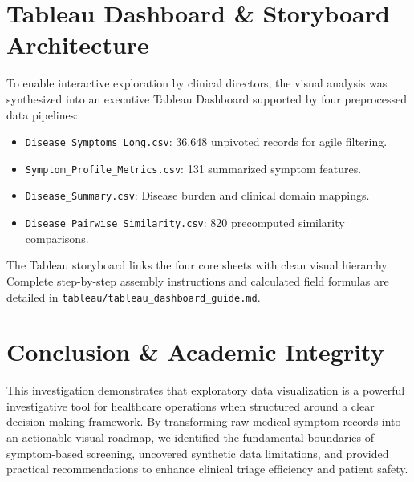 \documentclass[conference]{IEEEtran}
\begin{document}
\section{Tableau Dashboard \& Storyboard Architecture}
To enable interactive exploration by clinical directors, the visual analysis was synthesized into an executive Tableau Dashboard supported by four preprocessed data pipelines:
\begin{itemize}[noitemsep]
    \item \texttt{Disease\_Symptoms\_Long.csv}: 36,648 unpivoted records for agile filtering.
    \item \texttt{Symptom\_Profile\_Metrics.csv}: 131 summarized symptom features.
    \item \texttt{Disease\_Summary.csv}: Disease burden and clinical domain mappings.
    \item \texttt{Disease\_Pairwise\_Similarity.csv}: 820 precomputed similarity comparisons.
\end{itemize}
The Tableau storyboard links the four core sheets with clean visual hierarchy. Complete step-by-step assembly instructions and calculated field formulas are detailed in \texttt{tableau/tableau\_dashboard\_guide.md}.

\section{Conclusion \& Academic Integrity}
This investigation demonstrates that exploratory data visualization is a powerful investigative tool for healthcare operations when structured around a clear decision-making framework. By transforming raw medical symptom records into an actionable visual roadmap, we identified the fundamental boundaries of symptom-based screening, uncovered synthetic data limitations, and provided practical recommendations to enhance clinical triage efficiency and patient safety.
\end{document}

